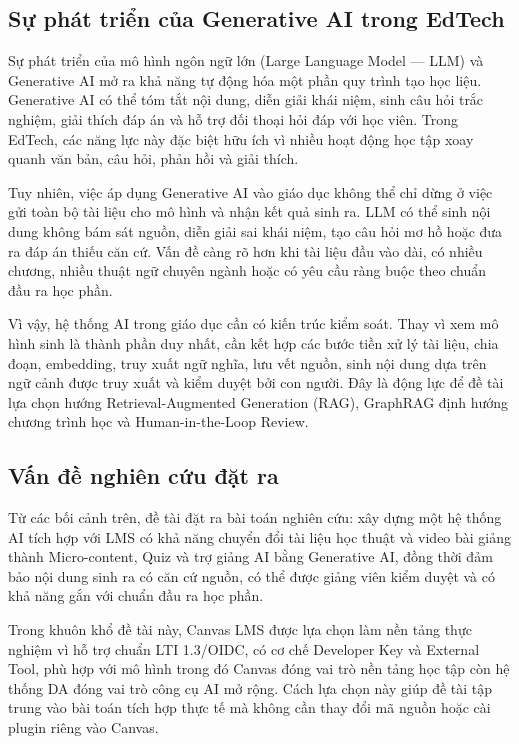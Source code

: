 \subsection{Sự phát triển của Generative AI trong EdTech}

Sự phát triển của mô hình ngôn ngữ lớn (Large Language Model --- LLM) và
Generative AI mở ra khả năng tự động hóa một phần quy trình tạo học liệu.
Generative AI có thể tóm tắt nội dung, diễn giải khái niệm, sinh câu hỏi trắc
nghiệm, giải thích đáp án và hỗ trợ đối thoại hỏi đáp với học viên. Trong
EdTech, các năng lực này đặc biệt hữu ích vì nhiều hoạt động học tập xoay
quanh văn bản, câu hỏi, phản hồi và giải thích.

Tuy nhiên, việc áp dụng Generative AI vào giáo dục không thể chỉ dừng ở việc
gửi toàn bộ tài liệu cho mô hình và nhận kết quả sinh ra. LLM có thể sinh nội
dung không bám sát nguồn, diễn giải sai khái niệm, tạo câu hỏi mơ hồ hoặc đưa
ra đáp án thiếu căn cứ. Vấn đề càng rõ hơn khi tài liệu đầu vào dài, có nhiều
chương, nhiều thuật ngữ chuyên ngành hoặc có yêu cầu ràng buộc theo chuẩn đầu
ra học phần.

Vì vậy, hệ thống AI trong giáo dục cần có kiến trúc kiểm soát. Thay vì xem mô
hình sinh là thành phần duy nhất, cần kết hợp các bước tiền xử lý tài liệu,
chia đoạn, embedding, truy xuất ngữ nghĩa, lưu vết nguồn, sinh nội dung dựa
trên ngữ cảnh được truy xuất và kiểm duyệt bởi con người. Đây là động lực để
đề tài lựa chọn hướng Retrieval-Augmented Generation (RAG), GraphRAG định
hướng chương trình học và Human-in-the-Loop Review.

\subsection{Vấn đề nghiên cứu đặt ra}

Từ các bối cảnh trên, đề tài đặt ra bài toán nghiên cứu: xây dựng một hệ thống
AI tích hợp với LMS có khả năng chuyển đổi tài liệu học thuật và video bài
giảng thành Micro-content, Quiz và trợ giảng AI bằng Generative AI, đồng thời
đảm bảo nội dung sinh ra có căn cứ nguồn, có thể được giảng viên kiểm duyệt và
có khả năng gắn với chuẩn đầu ra học phần.

Trong khuôn khổ đề tài này, Canvas LMS được lựa chọn làm nền tảng thực nghiệm
vì hỗ trợ chuẩn LTI 1.3/OIDC, có cơ chế Developer Key và External Tool, phù hợp
với mô hình trong đó Canvas đóng vai trò nền tảng học tập còn hệ thống DA đóng
vai trò công cụ AI mở rộng. Cách lựa chọn này giúp đề tài tập trung vào bài
toán tích hợp thực tế mà không cần thay đổi mã nguồn hoặc cài plugin riêng vào
Canvas.

